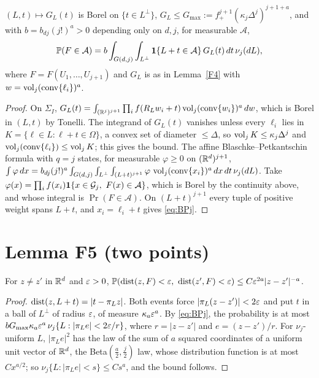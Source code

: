\documentclass[11pt]{article}
\begin{document}
\begin{lemma}\label{F0}
$(L,t)\mapsto G_L(t)$ is Borel on $\{t\in L^\perp\}$, $G_L\le G_{\max}:=f_+^{j+1}(\kappa_j\Delta^j)^{j+1+a}$, and with $b=b_{dj}(j!)^a>0$
depending only on $d,j$, for measurable $\mathcal A$,
\begin{equation}\label{eq:BPj}
  \mathbb{P}(F\in\mathcal A)=b\int_{G(d,j)}\int_{L^\perp}\mathbf{1}\{L+t\in\mathcal A\}\,G_L(t)\,dt\,\nu_j(dL),
\end{equation}
where $F=F(U_1,\dots,U_{j+1})$ and $G_L$ is as in Lemma~\ref{F4} with $w=\operatorname{vol}_j(\operatorname{conv}\{\ell_i\})^a$.
\end{lemma}

\begin{proof}
On $\Sigma_I$, $G_L(t)=\int_{(\mathbb{R}^j)^{j+1}}\prod_if(R_Lw_i+t)\operatorname{vol}_j(\operatorname{conv}\{w_i\})^a\,dw$, which is Borel in $(L,t)$ by Tonelli. The
integrand of $G_L(t)$ vanishes unless every $\ell_i$ lies in $K=\{\ell\in L:\ell+t\in\Omega\}$, a convex set of diameter $\le\Delta$, so
$\operatorname{vol}_jK\le\kappa_j\Delta^j$ and $\operatorname{vol}_j(\operatorname{conv}\{\ell_i\})\le\operatorname{vol}_jK$; this gives the bound. The affine Blaschke--Petkantschin
formula \cite[Theorem~7.2.7]{SW} with $q=j$ states, for measurable $\varphi\ge0$ on $(\mathbb{R}^d)^{j+1}$,
$\int\varphi\,dx=b_{dj}(j!)^a\int_{G(d,j)}\int_{L^\perp}\int_{(L+t)^{j+1}}\varphi\,\operatorname{vol}_j(\operatorname{conv}\{x_i\})^a\,dx\,dt\,\nu_j(dL)$. Take
$\varphi(x)=\prod_if(x_i)\Cone\{x\in\mathcal G_j,\ F(x)\in\mathcal A\}$, which is Borel by the continuity above, and whose integral is
$\Pr(F\in\mathcal A)$. On $(L+t)^{j+1}$ every tuple of positive weight spans $L+t$, and $x_i=\ell_i+t$ gives \eqref{eq:BPj}.
\end{proof}

\section*{Lemma F5 (two points)}

\begin{lemma}\label{F5}
For $z\ne z'$ in $\mathbb{R}^d$ and $\varepsilon>0$, $\mathbb{P}(\operatorname{dist}(z,F)<\varepsilon,\ \operatorname{dist}(z',F)<\varepsilon)\le C\varepsilon^{2a}|z-z'|^{-a}$.
\end{lemma}

\begin{proof}
$\operatorname{dist}(z,L+t)=|t-\pi_Lz|$. Both events force $|\pi_L(z-z')|<2\varepsilon$ and put $t$ in a ball of $L^\perp$ of radius $\varepsilon$, of
measure $\kappa_a\varepsilon^a$. By \eqref{eq:BPj}, the probability is at most $bG_{\max}\kappa_a\varepsilon^a\,\nu_j\{L:|\pi_Le|<2\varepsilon/r\}$, where
$r=|z-z'|$ and $e=(z-z')/r$. For $\nu_j$-uniform $L$, $|\pi_Le|^2$ has the law of the sum of $a$ squared coordinates of a
uniform unit vector of $\mathbb{R}^d$, the Beta$(\frac a2,\frac j2)$ law, whose distribution function is at most $Cx^{a/2}$; so
$\nu_j\{L:|\pi_Le|<s\}\le Cs^a$, and the bound follows.
\end{proof}
\end{document}
